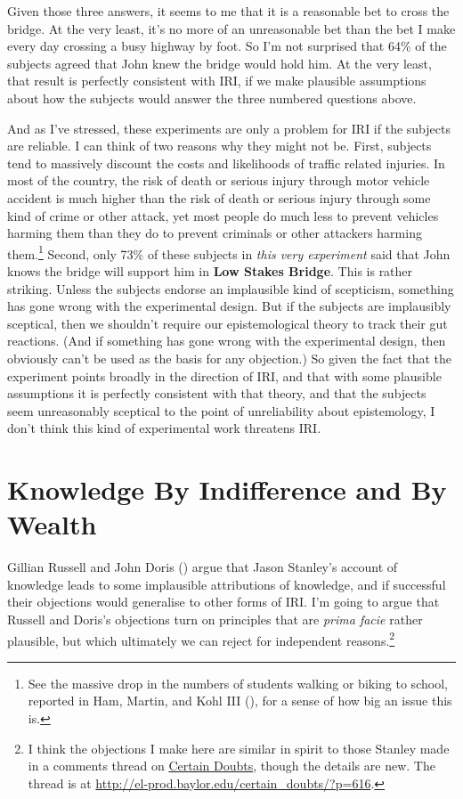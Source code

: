 \documentclass[
  11pt,
  letterpaper,
  DIV=11,
  numbers=noendperiod,
  twoside]{scrartcl}
\begin{document}
Given those three answers, it seems to me that it is a reasonable bet to
cross the bridge. At the very least, it's no more of an unreasonable bet
than the bet I make every day crossing a busy highway by foot. So I'm
not surprised that 64\% of the subjects agreed that John knew the bridge
would hold him. At the very least, that result is perfectly consistent
with IRI, if we make plausible assumptions about how the subjects would
answer the three numbered questions above.

And as I've stressed, these experiments are only a problem for IRI if
the subjects are reliable. I can think of two reasons why they might not
be. First, subjects tend to massively discount the costs and likelihoods
of traffic related injuries. In most of the country, the risk of death
or serious injury through motor vehicle accident is much higher than the
risk of death or serious injury through some kind of crime or other
attack, yet most people do much less to prevent vehicles harming them
than they do to prevent criminals or other attackers harming
them.\footnote{See the massive drop in the numbers of students walking
  or biking to school, reported in Ham, Martin, and Kohl III
  (), for a sense of how big an issue this
  is.} Second, only 73\% of these subjects in \emph{this very
experiment} said that John knows the bridge will support him in
\textbf{Low Stakes Bridge}. This is rather striking. Unless the subjects
endorse an implausible kind of scepticism, something has gone wrong with
the experimental design. But if the subjects are implausibly sceptical,
then we shouldn't require our epistemological theory to track their gut
reactions. (And if something has gone wrong with the experimental
design, then obviously can't be used as the basis for any objection.) So
given the fact that the experiment points broadly in the direction of
IRI, and that with some plausible assumptions it is perfectly consistent
with that theory, and that the subjects seem unreasonably sceptical to
the point of unreliability about epistemology, I don't think this kind
of experimental work threatens IRI.

\section{Knowledge By Indifference and By
Wealth}\label{knowledge-by-indifference-and-by-wealth}

Gillian Russell and John Doris ()
argue that Jason Stanley's account of knowledge leads to some
implausible attributions of knowledge, and if successful their
objections would generalise to other forms of IRI. I'm going to argue
that Russell and Doris's objections turn on principles that are
\emph{prima facie} rather plausible, but which ultimately we can reject
for independent reasons.\footnote{I think the objections I make here are
  similar in spirit to those Stanley made in a comments thread on
  \href{http://el-prod.baylor.edu/certain_doubts/?p=616}{Certain
  Doubts}, though the details are new. The thread is at
  \url{http://el-prod.baylor.edu/certain_doubts/?p=616}.}
\end{document}
